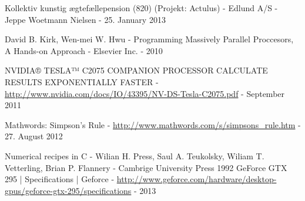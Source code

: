 \documentclass[oribibl]{llncs}
\numberwithin{equation}{section}
\begin{document}
	\begin{thebibliography}{9}
			 Kollektiv kunstig ægtefællepension (820) (Projekt: Actulus) - Edlund A/S - Jeppe Woetmann Nielsen - 25. January 2013 
			
			 David B. Kirk, Wen-mei W. Hwu - Programming Massively Parallel Proccesors, A Hands-on Approach - Elsevier Inc. - 2010
			
			 NVIDIA® TESLA™ C2075 COMPANION PROCESSOR CALCULATE RESULTS EXPONENTIALLY FASTER  - \url{http://www.nvidia.com/docs/IO/43395/NV-DS-Tesla-C2075.pdf} - September 2011
			
			 Mathwords: Simpson's Rule - \url{http://www.mathwords.com/s/simpsons_rule.htm} - 27. August 2012
			
			 Numerical recipes in C - Wilian H. Press, Saul A. Teukolsky, Wiliam T. Vetterling, Brian P. Flannery - Cambrige University Press 1992
			 GeForce GTX 295 | Specifications | Geforce - \url{http://www.geforce.com/hardware/desktop-gpus/geforce-gtx-295/specifications} - 2013
	\end{thebibliography}
	
	
	
\end{document}
